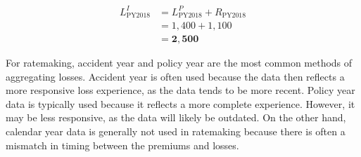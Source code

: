 \documentclass[10pt]{article}
\begin{document}
$$
\begin{aligned}
L_{\mathrm{PY} 2018}^{I} & =L_{\mathrm{PY} 2018}^{P}+R_{\mathrm{PY} 2018} \\
& =1,400+1,100 \\
& =\mathbf{2}, \mathbf{5 0 0}
\end{aligned}
$$

For ratemaking, accident year and policy year are the most common methods of aggregating losses. Accident year is often used because the data then reflects a more responsive loss experience, as the data tends to be more recent. Policy year data is typically used because it reflects a more complete experience. However, it may be less responsive, as the data will likely be outdated. On the other hand, calendar year data is generally not used in ratemaking because there is often a mismatch in timing between the premiums and losses.
\end{document}
